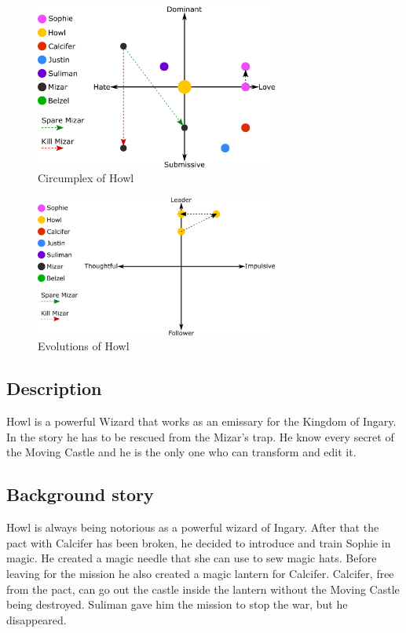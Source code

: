 \begin{figure}[H]
  \centering
  \includegraphics[width=8cm]{Images/SVG/Exported/Circumplexes/howlCircumplex}
  \caption{Circumplex of Howl}
\end{figure}

\begin{figure}[H]
  \centering
  \includegraphics[width=8cm]{Images/SVG/Exported/Evolutions/howlEvolution}
  \caption{Evolutions of Howl}
\end{figure}


\subsection{Description}
Howl is a powerful Wizard that works as an emissary for the Kingdom of Ingary. In the story he has to be rescued from the Mizar’s trap. He know every secret of the Moving Castle and he is the only one who can transform and edit it.

\subsection{Background story}
Howl is always being notorious as a powerful wizard of Ingary. After that the pact with Calcifer has been broken, he decided to introduce and train Sophie in magic. He created a magic needle that she can use to sew magic hats. Before leaving for the mission he also created a magic lantern for Calcifer. Calcifer, free from the pact, can go out the castle inside the lantern without the Moving Castle being destroyed. Suliman gave him the mission to stop the war, but he disappeared.
